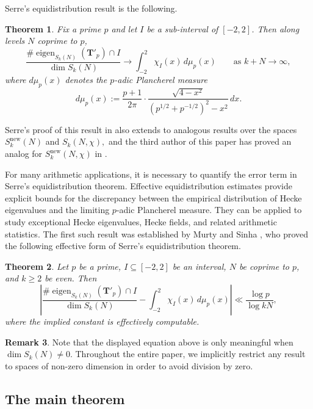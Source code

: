\documentclass[11pt,letterpaper,reqno]{amsart}
\newtheorem{theorem}{Theorem}[section]
\theoremstyle{definition}
\newtheorem{remark}[theorem]{Remark}
\numberwithin{equation}{section}
\numberwithin{figure}{section}
\numberwithin{table}{section}
\let\subsectiontemp\subsection
\renewcommand{\subsection}[1]{ 
    \subsectiontemp{#1} \hfill\vspace{0.5\linespacing} 
}
\newcommand{\nw}{\mathrm{new}}
\begin{document}
Serre's equidistribution result is the following.
{
\renewcommand{\thetheorem}{(Serre)}
\begin{theorem}
    Fix a prime $p$ and let $I$ be a sub-interval of $[-2, 2]$. Then along levels $N$ coprime to $p$,
    $$\frac{\# \operatorname{eigen}_{S_k(N)}(\mathbf{T}'_p) \cap I}{\dim S_k(N)} 
    \longrightarrow
    \int_{-2}^2 \chi_I(x)\, d\mu_p(x)
    \qquad
    \text{as }k + N \rightarrow \infty,
    $$
    where $d\mu_p(x)$ denotes the $p$-adic Plancherel measure 
    $$d\mu_p(x) := \frac{p + 1}{2\pi} \cdot \frac{\sqrt{4 - x^2}}{\left( p^{1/2} + p^{-1/2}  \right)^2 -  x^2} \,dx.$$
\end{theorem}
\addtocounter{theorem}{-1}
}

Serre's proof of this result in \cite{Ser97} also extends to analogous results over the spaces $S_k^\nw(N)$ and $S_k(N, \chi),$ and the third author of this paper has proved an analog for $S_k^\nw(N, \chi)$ in \cite{Ros26equidistribution}.

For many arithmetic applications, it is necessary to quantify the error term in Serre's equidistribution theorem. Effective equidistribution estimates provide explicit bounds for the discrepancy between the empirical distribution of Hecke eigenvalues and the limiting $p$-adic Plancherel measure. They can be applied to study exceptional Hecke eigenvalues, Hecke fields, and related arithmetic statistics. The first such result was established by Murty and Sinha \cite{MS07}, who proved the following effective form of Serre's equidistribution theorem.

{
\renewcommand{\thetheorem}{(Murty--Sinha: effective equidistribution)}
\begin{theorem}
Let $p$ be a prime, $I\subseteq [-2,2]$ be an interval, $N$ be coprime to $p$, and $k \ge 2$ be even. Then
\[
\left|
\frac{\# \operatorname{eigen}_{S_k(N)}(\mathbf{T}'_p) \cap I}
{\dim S_k(N)}
-
\int_{-2}^2 \chi_I(x)\, d\mu_p(x)
\right|
\ll
\frac{\log p}{\log kN},
\]
where the implied constant is effectively computable.
\end{theorem}
\addtocounter{theorem}{-1}
}

\begin{remark}
    Note that the displayed equation above is only meaningful when $\dim S_k(N) \ne 0$. Throughout the entire paper, we implicitly restrict any result to spaces of non-zero dimension in order to avoid division by zero.
\end{remark}

\subsection{The main theorem}\label{subsection:thm:main-theorem-statement}
\end{document}
